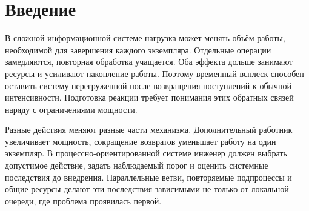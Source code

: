 \begin{abstract}
Рост нагрузки может замедлять отдельные операции и увеличивать повторную обработку, из-за чего перегрузка сохраняется после всплеска поступлений. Мы исследуем, какие зависимости должна сохранять исполнимая модель процесса для подготовки реакции по журналам, записанным до затяжной тяжёлой перегрузки. Метод обучает модели длительности и маршрутизации, сравнивает допустимые вмешательства при заданных стрессах и фиксирует действие с наблюдаемым правилом активации до независимой проверки. В последовательном контрольном случае сохранение нагрузочных зависимостей снижает стоимость незавершённой работы и вмешательства на 38.2\% относительно статического планирования и на 35.4\% относительно предиктивного отбора компонентов. Новая оценка охватывает 288 обучающих наборов и шесть структур с параллельными операциями, альтернативными маршрутами, несколькими возвратами и конкурирующими ресурсами. При нагрузочных возвратах полный конвейер с автоматически обнаруженной структурой снижает среднюю нормированную стоимость на 13.5\% относительно предиктивного отбора; скорректированный 97.5\%-ный интервал разности равен $[-0.1353,-0.0343]$. Выбор структуры, сохраняющей поведение возвратов и наблюдаемые условия маршрутизации, также улучшает решения относительно стандартного Inductive Miner. Польза зависит от механизма обратной связи и процесса. Результаты показывают, почему подготовка реакции требует как существенных для решения нагрузочных зависимостей, так и исполнимой структуры, сохраняющей смысл вмешательств.
\end{abstract}

\section{Введение}
В сложной информационной системе нагрузка может менять объём работы, необходимой для завершения каждого экземпляра. Отдельные операции замедляются, повторная обработка учащается. Оба эффекта дольше занимают ресурсы и усиливают накопление работы. Поэтому временный всплеск способен оставить систему перегруженной после возвращения поступлений к обычной интенсивности. Подготовка реакции требует понимания этих обратных связей наряду с ограничениями мощности.

Разные действия меняют разные части механизма. Дополнительный работник увеличивает мощность, сокращение возвратов уменьшает работу на один экземпляр. В процессно-ориентированной системе инженер должен выбрать допустимое действие, задать наблюдаемый порог и оценить системные последствия до внедрения. Параллельные ветви, повторяемые подпроцессы и общие ресурсы делают эти последствия зависимыми не только от локальной очереди, где проблема проявилась первой.

